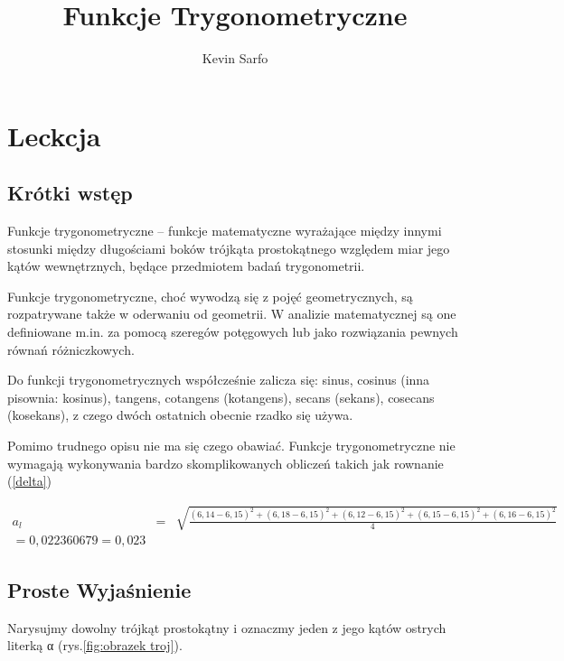 \documentclass[12pt,a4paper]{article}
\title{Funkcje Trygonometryczne}
\author{Kevin Sarfo}
\begin{document}
\maketitle

\tableofcontents
\newpage
\section{Leckcja}

\subsection{Krótki wstęp}

Funkcje trygonometryczne – funkcje matematyczne wyrażające między innymi stosunki między długościami boków trójkąta prostokątnego względem miar jego kątów wewnętrznych, będące przedmiotem badań trygonometrii.

Funkcje trygonometryczne, choć wywodzą się z pojęć geometrycznych, są rozpatrywane także w oderwaniu od geometrii. W analizie matematycznej są one definiowane m.in. za pomocą szeregów potęgowych lub jako rozwiązania pewnych równań różniczkowych.

Do funkcji trygonometrycznych współcześnie zalicza się: sinus, cosinus (inna pisownia: kosinus), tangens, cotangens (kotangens), secans (sekans), cosecans (kosekans), z czego dwóch ostatnich obecnie rzadko się używa.\cite{od}

Pomimo trudnego opisu nie ma się czego obawiać. Funkcje trygonometryczne nie wymagają wykonywania bardzo skomplikowanych obliczeń takich jak rownanie (\ref{delta})

\begin{equation}
\begin{array}{c} 
\label{delta}
a_l& =&\sqrt{\frac{(6,14-6,15)^2+(6,18-6,15)^2+(6,12-6,15)^2+
(6,15-6,15)^2+(6,16-6,15)^2}{4}} \\
=0,022360679=0,023
\end{array}
\end{equation}






\subsection{Proste Wyjaśnienie}

Narysujmy dowolny trójkąt prostokątny i oznaczmy jeden z jego kątów ostrych literką α (rys.\ref{fig:obrazek troj}).
\end{document}
